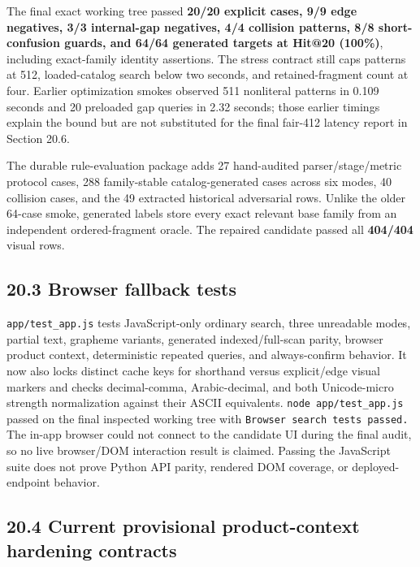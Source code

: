 The final exact working tree passed \textbf{20/20 explicit cases, 9/9 edge negatives, 3/3 internal-gap negatives, 4/4 collision patterns, 8/8 short-confusion guards, and 64/64 generated targets at Hit@20 (100\%)}, including exact-family identity assertions. The stress contract still caps patterns at 512, loaded-catalog search below two seconds, and retained-fragment count at four. Earlier optimization smokes observed 511 nonliteral patterns in 0.109 seconds and 20 preloaded gap queries in 2.32 seconds; those earlier timings explain the bound but are not substituted for the final fair-412 latency report in Section 20.6.

The durable rule-evaluation package adds 27 hand-audited parser/stage/metric
protocol cases, 288 family-stable catalog-generated cases across six modes, 40
collision cases, and the 49 extracted historical adversarial rows. Unlike the
older 64-case smoke, generated labels store every exact relevant base family
from an independent ordered-fragment oracle. The repaired candidate passed all
\textbf{404/404} visual rows.

\subsection{20.3 Browser fallback tests}\label{203-browser-fallback-tests}

\texttt{app/test\_\allowbreak{}app.js} tests JavaScript-only ordinary search, three unreadable modes, partial text, grapheme variants, generated indexed/full-scan parity, browser product context, deterministic repeated queries, and always-confirm behavior. It now also locks distinct cache keys for shorthand versus explicit/edge visual markers and checks decimal-comma, Arabic-decimal, and both Unicode-micro strength normalization against their ASCII equivalents. \texttt{node\ app/test\_\allowbreak{}app.js} passed on the final inspected working tree with \texttt{Browser\ search\ tests\ passed.} The in-app browser could not connect to the candidate UI during the final audit, so no live browser/DOM interaction result is claimed. Passing the JavaScript suite does not prove Python API parity, rendered DOM coverage, or deployed-endpoint behavior.

\subsection{20.4 Current provisional product-context hardening contracts}\label{204-current-provisional-product-context-hardening-contracts}

